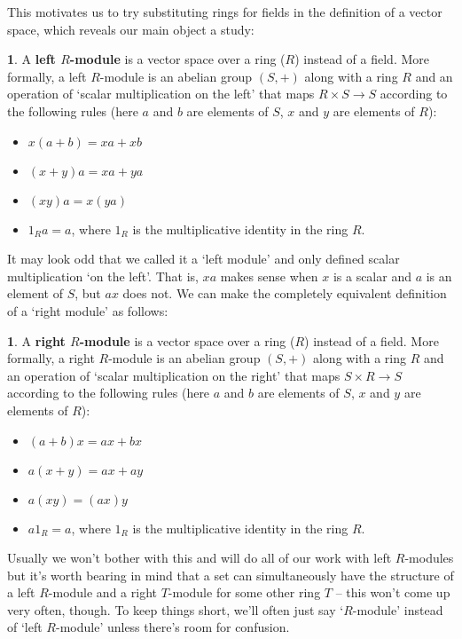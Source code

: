 \documentclass[oneside,english]{amsbook}
\numberwithin{section}{chapter}
\theoremstyle{plain}
\theoremstyle{definition}
\newtheorem{defn}[thm]{\protect\definitionname}
\providecommand{\definitionname}{Definition}
\begin{document}
			This motivates us to try substituting rings for fields in the definition of a vector space, which reveals our main object a study:
			
			\begin{defn}
				A \textbf{left $R$-module} is a vector space over a ring ($R$) instead of a field. More formally, a left $R$-module is an abelian group $(S, +)$ along with a ring $R$ and an operation of `scalar multiplication on the left' that maps $R\times S\to S$ according to the following rules (here $a$ and $b$ are elements of $S$, $x$ and $y$ are elements of $R$):
				\begin{itemize}
					\item $x(a + b) = xa + xb$ 
					\item $(x + y)a = xa + ya$
					\item $(xy)a = x(ya)$
					\item $1_Ra = a$, where $1_R$ is the multiplicative identity in the ring $R$.
				\end{itemize}
			\end{defn}
			
			It may look odd that we called it a `left module' and only defined scalar multiplication `on the left'. That is, $xa$ makes sense when $x$ is a scalar and $a$ is an element of $S$, but $ax$ does not. We can make the completely equivalent definition of a `right module' as follows:
			
			\begin{defn}
				A \textbf{right $R$-module} is a vector space over a ring ($R$) instead of a field. More formally, a right $R$-module is an abelian group $(S, +)$ along with a ring $R$ and an operation of `scalar multiplication on the right' that maps $S\times R\to S$ according to the following rules (here $a$ and $b$ are elements of $S$, $x$ and $y$ are elements of $R$):
				\begin{itemize}
					\item $(a + b)x = ax + bx$ 
					\item $a(x + y) = ax + ay$
					\item $a(xy) = (ax)y$
					\item $a1_R = a$, where $1_R$ is the multiplicative identity in the ring $R$.
				\end{itemize}
			\end{defn}
	
			Usually we won't bother with this and will do all of our work with left $R$-modules but it's worth bearing in mind that a set can simultaneously have the structure of a left $R$-module and a right $T$-module for some other ring $T$ -- this won't come up very often, though. To keep things short, we'll often just say `$R$-module' instead of `left $R$-module' unless there's room for confusion.
			
\end{document}
